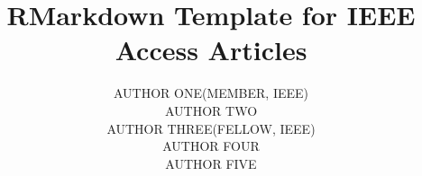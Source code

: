\documentclass[]{latex/ieeeaccess}
\providecommand\correspondingauthor{}
\begin{document}
\newlength{\xfigwd}
\setlength{\xfigwd}{\columnwidth}


\title{RMarkdown Template for IEEE Access Articles}

\setcounter{counter1}{1}
\author{
\begin{itemize*}[label={}, afterlabel={}, itemjoin={,~}, itemjoin*={, AND~}]
\item{\uppercase{Author One}\authorrefmark{\the\value{counter1}}{, }\uppercase{(Member, IEEE)}}%
\addtocounter{counter1}{1}
\item{\uppercase{Author Two}\authorrefmark{\the\value{counter1}}}%
\addtocounter{counter1}{1}
\item{\uppercase{Author Three}\authorrefmark{\the\value{counter1}}{, }\uppercase{(Fellow, IEEE)}}%
\addtocounter{counter1}{1}
\item{\uppercase{Author Four}\authorrefmark{\the\value{counter1}}}%
\addtocounter{counter1}{1}
\item{\uppercase{Author Five}\authorrefmark{\the\value{counter1}}}%
\addtocounter{counter1}{1}
\end{itemize*}
}

\setcounter{counter2}{1}
\address[\the\value{counter2}\addtocounter{counter2}{1}]{School of Electrical and Computer Engineering, University One of City, City, Postcode (e-mail: \href{mailto:author1@email.com}{\nolinkurl{author1@email.com}})}

%
\renewcommand\correspondingauthor{Corresponding author: Author One (e-mail: \href{mailto:author1@email.com}{\nolinkurl{author1@email.com}}).}
%
\address[\the\value{counter2}\addtocounter{counter2}{1}]{School of Electrical and Computer Engineering, University One of City, City, Postcode (e-mail: \href{mailto:author2@email.com}{\nolinkurl{author2@email.com}})}

%
\address[\the\value{counter2}\addtocounter{counter2}{1}]{School of Computer Science, National Institute of Science, City, Postcode (e-mail: \href{mailto:autho3@email.com}{\nolinkurl{autho3@email.com}})}

%
\address[\the\value{counter2}\addtocounter{counter2}{1}]{Department of Research and Development, University of City, City, Postcode (e-mail: \href{mailto:author4@email.com}{\nolinkurl{author4@email.com}})}
\end{document}
